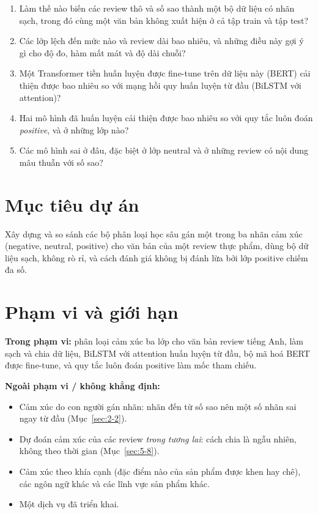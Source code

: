 \begin{enumerate}
    \item Làm thế nào biến các review thô và số sao thành một bộ dữ liệu có nhãn sạch, trong đó cùng một văn bản không xuất hiện ở cả tập train và tập test?
    \item Các lớp lệch đến mức nào và review dài bao nhiêu, và những điều này gợi ý gì cho độ đo, hàm mất mát và độ dài chuỗi?
    \item Một Transformer tiền huấn luyện được fine-tune trên dữ liệu này (BERT) cải thiện được bao nhiêu so với mạng hồi quy huấn luyện từ đầu (BiLSTM với attention)?
    \item Hai mô hình đã huấn luyện cải thiện được bao nhiêu so với quy tắc luôn đoán \emph{positive}, và ở những lớp nào?
    \item Các mô hình sai ở đâu, đặc biệt ở lớp neutral và ở những review có nội dung mâu thuẫn với số sao?
\end{enumerate}

\section{Mục tiêu dự án}
\label{sec:1-4}

Xây dựng và so sánh các bộ phân loại học sâu gán một trong ba nhãn cảm xúc (negative, neutral, positive) cho văn bản của một review thực phẩm, dùng bộ dữ liệu sạch, không rò rỉ, và cách đánh giá không bị đánh lừa bởi lớp positive chiếm đa số.

\section{Phạm vi và giới hạn}
\label{sec:1-5}

\textbf{Trong phạm vi:} phân loại cảm xúc ba lớp cho văn bản review tiếng Anh, làm sạch và chia dữ liệu, BiLSTM với attention huấn luyện từ đầu, bộ mã hoá BERT được fine-tune, và quy tắc luôn đoán positive làm mốc tham chiếu.

\textbf{Ngoài phạm vi / không khẳng định:}
\begin{itemize}
    \item Cảm xúc do con người gán nhãn: nhãn đến từ số sao nên một số nhãn sai ngay từ đầu (Mục~\ref{sec:2-2}).
    \item Dự đoán cảm xúc của các review \emph{trong tương lai}: cách chia là ngẫu nhiên, không theo thời gian (Mục~\ref{sec:5-8}).
    \item Cảm xúc theo khía cạnh (đặc điểm nào của sản phẩm được khen hay chê), các ngôn ngữ khác và các lĩnh vực sản phẩm khác.
    \item Một dịch vụ đã triển khai.
\end{itemize}

